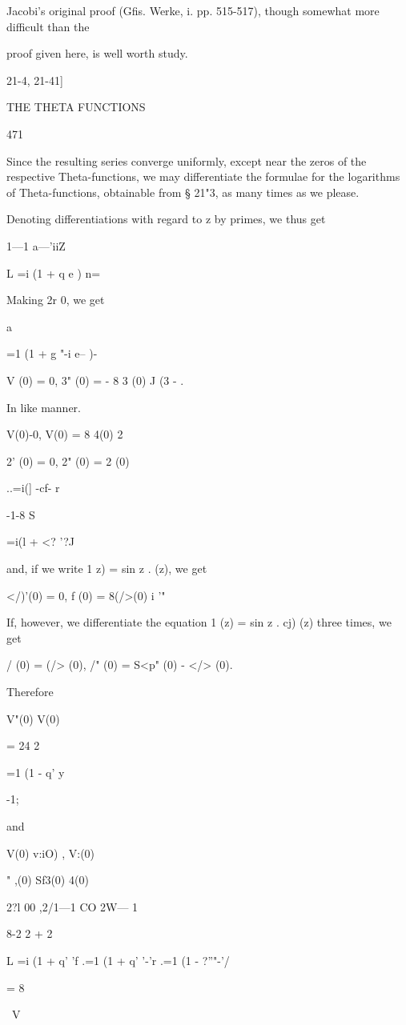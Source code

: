 Jacobi's original proof (Gfis. Werke, i. pp. 515-517), though somewhat
more difficult than the

proof given here, is well worth study.

21-4, 21-41]

THE THETA FUNCTIONS

471

Since the resulting series converge uniformly, except near the zeros
of the respective Theta-functions, we may differentiate the formulae
for the logarithms of Theta-functions, obtainable from § 21"3, as many
times as we please.

Denoting differentiations with regard to z by primes, we thus get


1—1 a—'iiZ

L =i (1 + q e ) n=\

Making 2r 0, we get

a%

=1 (1 + g "-i e-- )-

V (0) = 0, 3" (0) = - 8 3 (0) J (3 - .

In like manner.

V(0)-0, V(0) = 8 4(0) 2

 2' (0) = 0, 2" (0) = 2 (0)

..=i(] -cf- r

-1-8 S

 =i(l + <? '?J

and, if we write 1 z) = sin z . (z), we get

</)'(0) = 0, f (0) = 8(/>(0) i '"

If, however, we differentiate the equation 1 (z) = sin z . cj) (z)
three times, we get

 / (0) = (/> (0), /" (0) = S<p" (0) - </> (0).

Therefore

V"(0) V(0)

= 24 2

=1 (1 - q' y

-1;

and

V(0) v:iO) , V:(0)

" ,(0) Sf3(0) 4(0)

 2?l 00 ,2/1—1 CO 2W— 1

8-2 2 + 2

L =i (1 + q' 'f .=1 (1 + q' '-'r .=1 (1 - ?''"-'/

= 8

\ V

